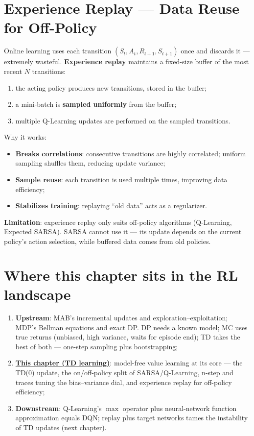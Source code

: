 \documentclass{article}
\begin{document}
\section*{Experience Replay --- Data Reuse for Off-Policy}

Online learning uses each transition $(S_t,A_t,R_{t+1},S_{t+1})$ once and discards it --- extremely wasteful. \textbf{Experience replay} maintains a fixed-size buffer of the most recent $N$ transitions:

\begin{enumerate}
  \item the acting policy produces new transitions, stored in the buffer;
  \item a mini-batch is \textbf{sampled uniformly} from the buffer;
  \item multiple Q-Learning updates are performed on the sampled transitions.
\end{enumerate}

Why it works:
\begin{itemize}
  \item \textbf{Breaks correlations}: consecutive transitions are highly correlated; uniform sampling shuffles them, reducing update variance;
  \item \textbf{Sample reuse}: each transition is used multiple times, improving data efficiency;
  \item \textbf{Stabilizes training}: replaying ``old data'' acts as a regularizer.
\end{itemize}

\textbf{Limitation}: experience replay only suits off-policy algorithms (Q-Learning, Expected SARSA). SARSA cannot use it --- its update depends on the current policy's action selection, while buffered data comes from old policies.

\section*{Where this chapter sits in the RL landscape}

\begin{enumerate}
  \item \textbf{Upstream}: MAB's incremental updates and exploration--exploitation; MDP's Bellman equations and exact DP. DP needs a known model; MC uses true returns (unbiased, high variance, waits for episode end); TD takes the best of both --- one-step sampling plus bootstrapping;
  \item \underline{\textbf{This chapter (TD learning)}}: model-free value learning at its core --- the TD(0) update, the on/off-policy split of SARSA/Q-Learning, n-step and traces tuning the bias--variance dial, and experience replay for off-policy efficiency;
  \item \textbf{Downstream}: Q-Learning's $\max$ operator plus neural-network function approximation equals DQN; replay plus target networks tames the instability of TD updates (next chapter).
\end{enumerate}
\end{document}
